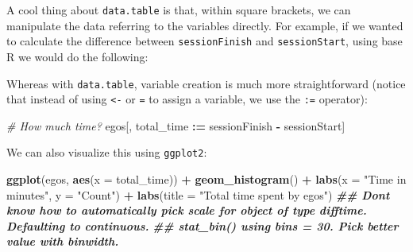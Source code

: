\documentclass[
]{book}
\newenvironment{Shaded}{\begin{snugshade}}{\end{snugshade}}
\newcommand{\AttributeTok}[1]{\textcolor[rgb]{0.13,0.29,0.53}{#1}}
\newcommand{\CommentTok}[1]{\textcolor[rgb]{0.56,0.35,0.01}{\textit{#1}}}
\newcommand{\DocumentationTok}[1]{\textcolor[rgb]{0.56,0.35,0.01}{\textbf{\textit{#1}}}}
\newcommand{\FunctionTok}[1]{\textcolor[rgb]{0.13,0.29,0.53}{\textbf{#1}}}
\newcommand{\NormalTok}[1]{#1}
\newcommand{\OtherTok}[1]{\textcolor[rgb]{0.56,0.35,0.01}{#1}}
\newcommand{\SpecialCharTok}[1]{\textcolor[rgb]{0.81,0.36,0.00}{\textbf{#1}}}
\newcommand{\StringTok}[1]{\textcolor[rgb]{0.31,0.60,0.02}{#1}}
\begin{document}
A cool thing about \texttt{data.table} is that, within square brackets, we can manipulate the data referring to the variables directly. For example, if we wanted to calculate the difference between \texttt{sessionFinish} and \texttt{sessionStart}, using base R we would do the following:

\begin{Shaded}
\end{Shaded}

Whereas with \texttt{data.table}, variable creation is much more straightforward (notice that instead of using \texttt{\textless{}-} or \texttt{=} to assign a variable, we use the \texttt{:=} operator):

\begin{Shaded}
\begin{Highlighting}[]
\CommentTok{\# How much time?}
\NormalTok{egos[, total\_time }\SpecialCharTok{:=}\NormalTok{ sessionFinish }\SpecialCharTok{{-}}\NormalTok{ sessionStart]}
\end{Highlighting}
\end{Shaded}

We can also visualize this using \texttt{ggplot2}:

\begin{Shaded}
\begin{Highlighting}[]
\FunctionTok{ggplot}\NormalTok{(egos, }\FunctionTok{aes}\NormalTok{(}\AttributeTok{x =}\NormalTok{ total\_time)) }\SpecialCharTok{+}
  \FunctionTok{geom\_histogram}\NormalTok{() }\SpecialCharTok{+}
  \FunctionTok{labs}\NormalTok{(}\AttributeTok{x =} \StringTok{"Time in minutes"}\NormalTok{, }\AttributeTok{y =} \StringTok{"Count"}\NormalTok{) }\SpecialCharTok{+}
  \FunctionTok{labs}\NormalTok{(}\AttributeTok{title =} \StringTok{"Total time spent by egos"}\NormalTok{)}
\DocumentationTok{\#\# Don\textquotesingle{}t know how to automatically pick scale for object of type difftime. Defaulting to continuous.}
\DocumentationTok{\#\# \textasciigrave{}stat\_bin()\textasciigrave{} using \textasciigrave{}bins = 30\textasciigrave{}. Pick better value with \textasciigrave{}binwidth\textasciigrave{}.}
\end{Highlighting}
\end{Shaded}
\end{document}
